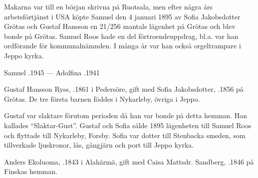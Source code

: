 Makarna var till en början skrivna på Ruotsala, men efter några års	arbetsförtjänst i USA köpte Samuel den 4 januari 1895 av Sofia Jakobsdotter Grötas och Gustaf Hansson en 21/256 mantals lägenhet	på Grötas och blev bonde på Grötas. Samuel Roos hade en del förtroendeuppdrag, bl.a. var han ordförande för kommunalnämnden. I många år var han också orgeltrampare i Jeppo kyrka.

Samuel .1945  ---  Adolfina .1941


%
Gustaf Hansson Ryss, .1861 i Pedersöre, gift med Sofia Jakobsdotter, .1856 på Grötas. De tre första barnen föddes i Nykarleby, övriga i Jeppo.
\begin{jhchildren}
  \item {}
  \item {}
  \item {}
  \item {}
  \item {}
  \item {}
  \item {}
\end{jhchildren}

Gustaf var slaktare förutom perioden då han var bonde på detta hemman. Han kallades ``Slaktar-Gust''. Gustaf och Sofia sålde 1895 lägenheten till Samuel Roos och flyttade till Nykarleby, Forsby. Sofia var dotter till Stenbacka smeden, som tillverkade ljuskronor, lås, gångjärn och port till Jeppo kyrka.


%
Anders Ekoluoma, .1843 i Alahärmä, gift med Caisa Mattsdr. Sandberg, .1846 på Finskas hemman.
\begin{jhchildren}
  \item {}
  \item {}
  \item {}
  \item {}
\end{jhchildren}

